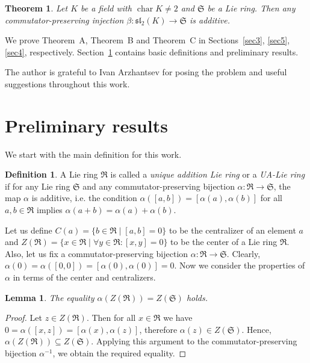 \documentclass[a4paper,reqno,12pt]{amsart}
\newtheorem{lemma}[proposition]{Lemma}
\newtheorem{lettertheorem}{Theorem}
\theoremstyle{definition}
\newtheorem{definition}[proposition]{Definition}
\theoremstyle{remark}
\DeclareMathOperator{\Char}{char}
\def\RRR{\mathfrak{R}}
\def\SSS{\mathfrak{S}}
\def\sl{\mathfrak{sl}}
\begin{document}
	\begin{lettertheorem}\label{theorem:injectionsForsl2}
		Let $K$ be a field with $\Char K \neq 2$ and $\SSS$ be a Lie ring. Then any commutator-preserving injection $\beta : \sl_2(K) \rightarrow \SSS$ is additive.
	\end{lettertheorem}

	We prove Theorem~A, Theorem~B and Theorem~C in Sections~\ref{sec3}, \ref{sec5}, \ref{sec4}, respectively. Section~\ref{sec2} contains basic definitions and preliminary results.

	The author is grateful to Ivan Arzhantsev for posing the problem and useful suggestions throughout this work.

	\section{Preliminary results}
	\label{sec2}

	We start with the main definition for this work.

	\begin{definition}
		A Lie ring $\RRR$ is called a \textit{unique addition Lie ring} or a \textit{UA-Lie ring} if for any Lie ring $\SSS$ and any commutator-preserving bijection $\alpha : \RRR \rightarrow \SSS$, the map $\alpha$ is additive, i.e. the condition $\alpha([a, b]) = [\alpha(a), \alpha(b)]$ for all $a, b \in \RRR$ implies $\alpha(a + b) = \alpha(a) + \alpha(b)$.
	\end{definition}

	Let us define $C(a) = \lbrace b \in \RRR \mid [a, b] = 0 \rbrace$ to be the centralizer of an element $a$ and $Z(\RRR) = \lbrace x \in \RRR \mid \forall y \in \RRR : [x, y] = 0 \rbrace$ to be the center of a Lie ring $\RRR$. Also, let us fix a commutator-preserving bijection $\alpha : \RRR \rightarrow \SSS$. Clearly, $\alpha(0) = \alpha([0, 0]) = [\alpha(0), \alpha(0)] = 0$. Now we consider the properties of $\alpha$ in terms of the center and centralizers.

	\begin{lemma}\label{lemma:bijectionSavesCenter}
		The equality $\alpha(Z(\RRR)) = Z(\SSS)$ holds.
	\end{lemma}

	\begin{proof}
		Let $z \in Z(\RRR)$. Then for all $x \in \RRR$ we have $0 = \alpha([x, z]) = [\alpha(x), \alpha(z)]$, therefore $\alpha(z) \in Z(\SSS)$. Hence, $\alpha(Z(\RRR)) \subseteq Z(\SSS)$. Applying this argument to the commutator-preserving bijection $\alpha^{-1}$, we obtain the required equality.
	\end{proof}
\end{document}
